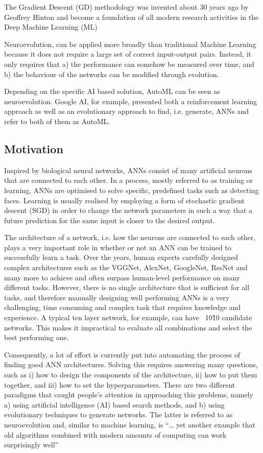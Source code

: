 \documentclass[journal, a4paper]{IEEEtran}
\begin{document}
The Gradient Descent (GD) methodology was invented about 30 years ago by Geoffrey Hinton and become a foundation of all modern research activities in the Deep Machine Learning (ML) 

Neuroevolution, can be applied more broadly than traditional Machine Learning because it does not require a large set of correct input-output pairs. Instead, it only requires that a) the performance can somehow be measured over time, and b) the behaviour of the networks can be modified through evolution. \cite{cite05}

Depending on the specific AI based solution, AutoML can be seen as neuroevolution. Google AI, for example, presented both a reinforcement learning approach as well as an evolutionary approach to find, i.e. generate, ANNs and refer to both of them as AutoML. \cite{cite05}

\subsection{Motivation}

Inspired by biological neural networks, ANNs consist of many artificial neurons that are connected to each other. In a process, mostly referred to as training or learning, ANNs are optimised to solve specific, predefined tasks such as detecting faces. Learning is usually realised by employing a form of stochastic gradient descent (SGD) in order to change the network parameters in such a way that a future prediction for the same input is closer to the desired output. \cite{cite05}

The architecture of a network, i.e. how the neurons are connected to each other, plays a very important role in whether or not an ANN can be trained to successfully learn a task. Over the years, human experts carefully designed complex architectures such as the VGGNet, AlexNet, GoogleNet, ResNet and many more to achieve and often surpass human-level performance on many different tasks. However, there is no single architecture that is sufficient for all tasks, and therefore manually designing well performing ANNs is a very challenging, time consuming and complex task that requires knowledge and experience. A typical ten layer network, for example, can have ~10\^10 candidate networks. This makes it impractical to evaluate all combinations and select the best performing one. \cite{cite05}

Consequently, a lot of effort is currently put into automating the process of finding good ANN architectures. Solving this requires answering many questions, such as i) how to design the components of the architecture, ii) how to put them together, and iii) how to set the hyperparameters. There are two different paradigms that caught people’s attention in approaching this problems, namely a) using artificial intelligence (AI) based search methods, and b) using evolutionary techniques to generate networks. The latter is referred to as neuroevolution and, similar to machine learning, is “… yet another example that old algorithms combined with modern amounts of computing can work surprisingly well” \cite{cite05}
\end{document}
